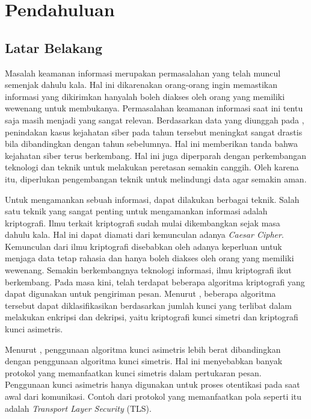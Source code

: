 \chapter{Pendahuluan}

\section{Latar Belakang}
Masalah keamanan informasi merupakan permasalahan yang telah muncul semenjak dahulu kala. Hal ini dikarenakan orang-orang ingin memastikan informasi yang dikirimkan hanyalah boleh diakses oleh orang yang memiliki wewenang untuk membukanya. Permasalahan keamanan informasi saat ini tentu saja masih menjadi yang sangat relevan. Berdasarkan data yang diunggah pada \textcite{pusiknaspolri_cybercrime_2022}, penindakan kasus kejahatan siber pada tahun tersebut meningkat sangat drastis bila dibandingkan dengan tahun sebelumnya. Hal ini memberikan tanda bahwa kejahatan siber terus berkembang. Hal ini juga diperparah dengan perkembangan teknologi dan teknik untuk melakukan peretasan semakin canggih. Oleh karena itu, diperlukan pengembangan teknik untuk melindungi data agar semakin aman.

Untuk mengamankan sebuah informasi, dapat dilakukan berbagai teknik. Salah satu teknik yang sangat penting untuk mengamankan informasi adalah kriptografi. Ilmu terkait kriptografi sudah mulai dikembangkan sejak masa dahulu kala. Hal ini dapat diamati dari kemunculan adanya \emph{Caesar Cipher}. Kemunculan dari ilmu kriptografi disebabkan oleh adanya keperluan untuk menjaga data tetap rahasia dan hanya boleh diakses oleh orang yang memiliki wewenang. Semakin berkembangnya teknologi informasi, ilmu kriptografi ikut berkembang. Pada masa kini, telah terdapat beberapa  algoritma kriptografi yang dapat digunakan untuk pengiriman pesan. Menurut \textcite{munir2019}, beberapa algoritma tersebut dapat diklasifikasikan berdasarkan jumlah kunci yang terlibat dalam melakukan enkripsi dan dekripsi, yaitu kriptografi kunci simetri dan kriptografi kunci asimetris.

Menurut \textcite{halak2022}, penggunaan algoritma kunci asimetris lebih berat dibandingkan dengan penggunaan algoritma kunci simetris. Hal ini menyebabkan banyak protokol yang memanfaatkan kunci simetris dalam pertukaran pesan. Penggunaan kunci asimetris hanya digunakan untuk proses otentikasi pada saat awal dari komunikasi. Contoh dari protokol yang memanfaatkan pola seperti itu adalah \emph{Transport Layer Security} (TLS).

